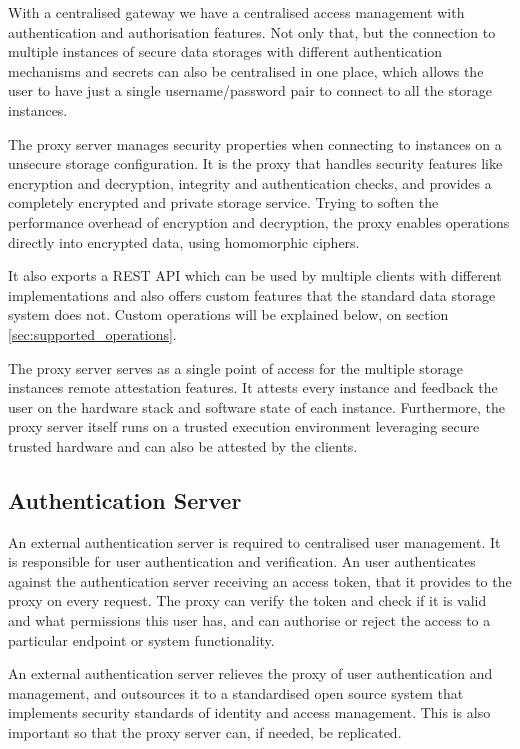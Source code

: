 With a centralised gateway we have a centralised access management with authentication and authorisation features. Not only that, but the connection to multiple instances of secure data storages with different authentication mechanisms and secrets can also be centralised in one place, which allows the user to have just a single username/password pair to connect to all the storage instances.

The proxy server manages security properties when connecting to instances on a unsecure storage configuration. It is the proxy that handles security features like encryption and decryption, integrity and authentication checks, and provides a completely encrypted and private storage service. Trying to soften the performance overhead of encryption and decryption, the proxy enables operations directly into encrypted data, using homomorphic ciphers. 

It also exports a \gls{REST} \gls{API} which can be used by multiple clients with different implementations and also offers custom features that the standard data storage system does not. Custom operations will be explained below, on section \ref{sec:supported_operations}.

The proxy server serves as a single point of access for the multiple storage instances remote attestation features. It attests every instance and feedback the user on the hardware stack and software state of each instance. Furthermore, the proxy server itself runs on a trusted execution environment leveraging secure trusted hardware and can also be attested by the clients.

\subsection{Authentication Server}
\label{ssec:authentication_server}

An external authentication server is required to centralised user management. It is responsible for user authentication and verification. An user authenticates against the authentication server receiving an access token, that it provides to the proxy on every request. The proxy can verify the token and check if it is valid and what permissions this user has, and can authorise or reject the access to a particular endpoint or system functionality.

An external authentication server relieves the proxy of user authentication and management, and outsources it to a standardised open source system that implements security standards of identity and access management. This is also important so that the proxy server can, if needed, be replicated.

